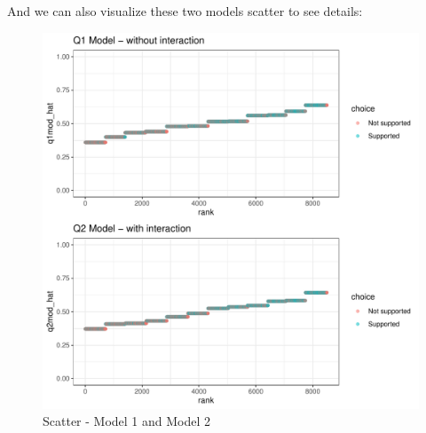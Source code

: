 \documentclass{article} %
\begin{document}
And we can also visualize these two models scatter to see details:\\

 

\begin{figure}[h]
	\centering
	\includegraphics[scale=1]{q2_plot1.pdf} 
	\caption{Scatter - Model 1 and Model 2}
\end{figure}
\end{document}
